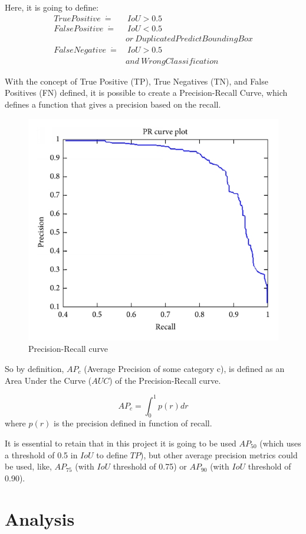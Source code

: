 \documentclass[11pt, a4paper, onecolumn]{article}
\begin{document}
Here, it is going to define:
\begin{align*}
TruePositive\ \dot=&\ IoU > 0.5 \\
FalsePositive\ \dot=&\ IoU < 0.5 \\
&or\ Duplicated PredictBoundingBox \\
FalseNegative\ \dot=&\ IoU > 0.5\ \\ 
&and \ WrongClassification
\end{align*}

With the concept of True Positive (TP), True Negatives (TN), and False Positives (FN) defined, it is possible to create a Precision-Recall Curve, which defines a function that gives a precision based on the recall.

\begin{figure}[!ht]
	
	\centering
	\includegraphics[width=.5\textwidth]{precision-recall.png}
	\caption{\scriptsize Precision-Recall curve \cite{medium:1}}
	
\end{figure}

So by definition, $AP_c$ (Average Precision of some category c), is defined as an Area Under the Curve ($AUC$) of the Precision-Recall curve.

{\centering
	\begin{equation*}
	AP_c = \int_{0}^{1} p(r) dr
	\end{equation*}
	where $p(r)$ is the precision defined in function of recall.}

It is essential to retain that in this project it is going to be used $AP_{50}$ (which uses a threshold of 0.5 in $IoU$ to define $TP$), but other average precision metrics could be used, like, $AP_{75}$ (with $IoU$ threshold of 0.75) or $AP_{90}$ (with $IoU$ threshold of 0.90).

\section{Analysis}
\end{document}
